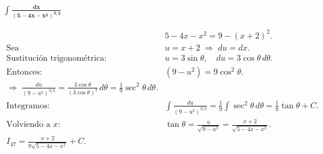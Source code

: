 $\displaystyle \mathbf{\int \frac{dx}{(5 - 4x - x^{2})^{3/2}}}$

\nopagebreak
$$
\begin{aligned}
&5 - 4x - x^{2} = 9 - (x + 2)^{2}. \\[4pt]
\text{Sea } &u = x + 2 \;\Rightarrow\; du = dx. \\[4pt]
\text{Sustitución trigonométrica: } &u = 3\sin\theta,\quad du = 3\cos\theta\,d\theta. \\[4pt]
\text{Entonces: } &(9 - u^{2}) = 9\cos^{2}\theta. \\[4pt]
\Rightarrow\;
\frac{du}{(9 - u^{2})^{3/2}}
= \frac{3\cos\theta}{(3\cos\theta)^{3}}\,d\theta
= \frac{1}{9}\sec^{2}\theta\,d\theta. \\[6pt]
\text{Integramos: } &
\int \frac{du}{(9 - u^{2})^{3/2}}
= \frac{1}{9}\int \sec^{2}\theta\,d\theta
= \frac{1}{9}\tan\theta + C. \\[6pt]
\text{Volviendo a } x: &
\tan\theta = \frac{u}{\sqrt{9 - u^{2}}}
= \frac{x + 2}{\sqrt{5 - 4x - x^{2}}}. \\[6pt]
\boxed{\displaystyle
I_{47} = \frac{x + 2}{9\sqrt{5 - 4x - x^{2}}} + C.}
\end{aligned}
$$
